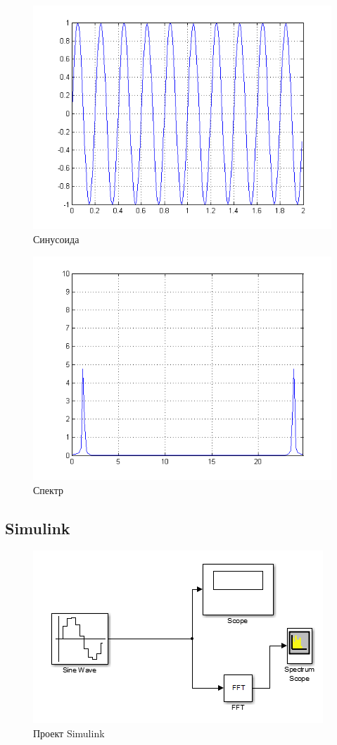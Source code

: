 \documentclass[a4paper, 12pt]{article}
\begin{document}
\begin{figure}[H]
   \includegraphics[scale=0.7]{lab4/sin.png}
   \caption{Синусоида}
\end{figure}

\begin{figure}[H]
   \includegraphics[scale=0.7]{lab4/spectre.png}
   \caption{Спектр}
\end{figure}

\subsection{Simulink}

\begin{figure}[H]
   \includegraphics[scale=0.7]{lab4/simulink.png}
   \caption{Проект Simulink}
\end{figure}
\end{document}

